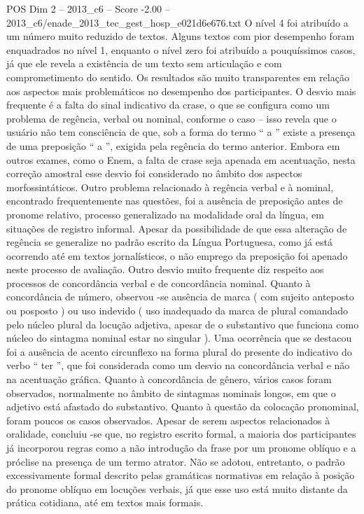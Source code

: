 \begin{textsample}{POS Dim 2 – 2013\_c6 – Score -2.00 – 2013\_c6/enade\_2013\_tec\_gest\_hosp\_e021d6e676.txt}
O nível 4 foi atribuído a um número muito reduzido de textos.
Alguns textos com pior desempenho foram enquadrados no nível 1, enquanto o nível zero foi atribuído a pouquíssimos casos, já que ele revela a existência de um texto sem articulação e com comprometimento do sentido.
Os resultados são muito transparentes em relação aos aspectos mais problemáticos no desempenho dos participantes.
O desvio mais frequente é a falta do sinal indicativo da crase, o que se configura como um problema de regência, verbal ou nominal, conforme o caso – isso revela que o usuário não tem consciência de que, sob a forma do termo “ a ” existe a presença de uma preposição “ a ”, exigida pela regência do termo anterior.
Embora em outros exames, como o Enem, a falta de crase seja apenada em acentuação, nesta correção amostral esse desvio foi considerado no âmbito dos aspectos morfossintáticos.
Outro problema relacionado à regência verbal e à nominal, encontrado frequentemente nas questões, foi a ausência de preposição antes de pronome relativo, processo generalizado na modalidade oral da língua, em situações de registro informal.
Apesar da possibilidade de que essa alteração de regência se generalize no padrão escrito da Língua Portuguesa, como já está ocorrendo até em textos jornalísticos, o não emprego da preposição foi apenado neste processo de avaliação.
Outro desvio muito frequente diz respeito aos processos de concordância verbal e de concordância nominal.
Quanto à concordância de número, observou -se ausência de marca ( com sujeito anteposto ou posposto ) ou uso indevido ( uso inadequado da marca de plural comandado pelo núcleo plural da locução adjetiva, apesar de o substantivo que funciona como núcleo do sintagma nominal estar no singular ).
Uma ocorrência que se destacou foi a ausência de acento circunflexo na forma plural do presente do indicativo do verbo “ ter ”, que foi considerada como um desvio na concordância verbal e não na acentuação gráfica.
Quanto à concordância de gênero, vários casos foram observados, normalmente no âmbito de sintagmas nominais longos, em que o adjetivo está afastado do substantivo.
Quanto à questão da colocação pronominal, foram poucos os casos observados.
Apesar de serem aspectos relacionados à oralidade, concluiu -se que, no registro escrito formal, a maioria dos participantes já incorporou regras como a não introdução da frase por um pronome oblíquo e a próclise na presença de um termo atrator.
Não se adotou, entretanto, o padrão excessivamente formal descrito pelas gramáticas normativas em relação à posição do pronome oblíquo em locuções verbais, já que esse uso está muito distante da prática cotidiana, até em textos mais formais.

\end{textsample}
